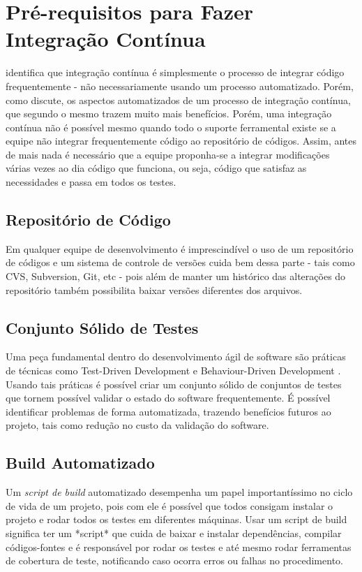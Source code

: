 \documentclass[10pt,a4paper,font=plain]{abnt}
\begin{document}
\section{Pré-requisitos para Fazer Integração Contínua}

 identifica que integração contínua é simplesmente o processo de integrar código frequentemente - não necessariamente usando um processo automatizado. Porém, como  discute, os aspectos automatizados de um processo de integração contínua, que segundo o mesmo trazem muito mais benefícios.
Porém, uma integração contínua não é possível mesmo quando todo o suporte ferramental existe se a equipe não integrar frequentemente código ao repositório de códigos. Assim, antes de mais nada é necessário que a equipe proponha-se a integrar modificações várias vezes ao dia código que funciona, ou seja, código que satisfaz as necessidades e passa em todos os testes.


\subsection{Repositório de Código}

Em qualquer equipe de desenvolvimento é imprescindível o uso de um repositório de códigos e um sistema de controle de versões cuida bem dessa parte - tais como CVS, Subversion, Git, etc - pois além de manter um histórico das alterações do repositório também possibilita baixar versões diferentes dos arquivos.

\subsection{Conjunto Sólido de Testes}

Uma peça fundamental dentro do desenvolvimento ágil de software são práticas de técnicas como Test-Driven Development\cite{TDD} e Behaviour-Driven Development \cite{BDD}. Usando tais práticas é possível criar um conjunto sólido de conjuntos de testes que tornem possível validar o estado do software frequentemente. É possível identificar problemas de forma automatizada, trazendo benefícios futuros ao projeto, tais como redução no custo da validação do software.


\subsection{Build Automatizado}

Um \textit{script de build} automatizado desempenha um papel importantíssimo no ciclo de vida de um projeto, pois com ele é possível que todos consigam instalar o projeto e rodar todos os testes em diferentes máquinas. Usar um script de build significa ter um *script* que cuida de baixar e instalar dependências, compilar códigos-fontes e é responsável por rodar os testes e até mesmo rodar ferramentas de cobertura de teste, notificando caso ocorra erros ou falhas no procedimento.
\end{document}

